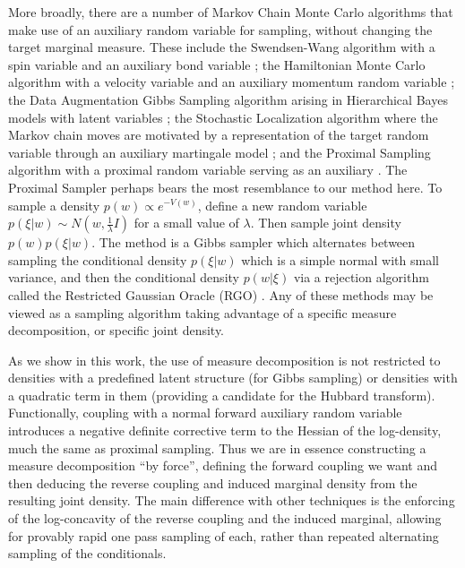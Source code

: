 \documentclass{article}
\numberwithin{equation}{section}
\theoremstyle{Lemma}
\theoremstyle{Corollary}
\theoremstyle{Theorem}
\theoremstyle{Remark}
\begin{document}
More broadly, there are a number of Markov Chain Monte Carlo algorithms that make use of an auxiliary random variable for sampling, without changing the target marginal measure. These include the Swendsen-Wang algorithm with a spin variable and an auxiliary bond variable \cite{swendsen1987nonuniversal}; the Hamiltonian Monte Carlo algorithm with a velocity variable and an auxiliary momentum random variable \cite{betancourt2017conceptual}; the Data Augmentation Gibbs Sampling algorithm arising in Hierarchical Bayes models with latent variables \cite{tanner1987calculation}; the Stochastic Localization algorithm where the Markov chain moves are motivated by a representation of the target random variable through an auxiliary martingale model \cite{el2022sampling, chen2022localization,montanari2023sampling}; and the Proximal Sampling algorithm with a proximal random variable serving as an auxiliary \cite{chen2022improved, huang2024faster}. The Proximal Sampler perhaps bears the most resemblance to our method here. To sample a density $p(w) \propto e^{-V(w)}$, define a new random variable $p(\xi|w) \sim N(w,\frac{1}{\lambda} I)$ for a small value of $\lambda$. Then sample joint density $p(w)p(\xi|w)$. The method is a Gibbs sampler which alternates between sampling the conditional density $p(\xi|w)$ which is a simple normal with small variance, and then the conditional density $p(w|\xi)$ via a rejection algorithm called the Restricted Gaussian Oracle (RGO) \cite{lee2021structured}. Any of these methods may be viewed as a sampling algorithm taking advantage of a specific measure decomposition, or specific joint density.

As we show in this work, the use of measure decomposition is not restricted to densities with a predefined latent structure (for Gibbs sampling) or densities with a quadratic term in them (providing a candidate for the Hubbard transform). Functionally, coupling with a normal forward auxiliary random variable introduces a negative definite corrective term to the Hessian of the log-density, much the same as proximal sampling. Thus we are in essence constructing a measure decomposition ``by force'', defining the forward coupling we want and then deducing the reverse coupling and induced marginal density from the resulting joint density.  The main difference with other techniques is the enforcing of the log-concavity of the reverse coupling and the induced marginal, allowing for provably rapid one pass sampling of each, rather than repeated alternating sampling of the conditionals.
\end{document}

